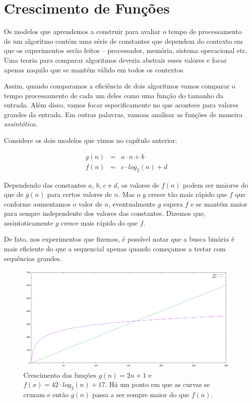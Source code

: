 \chapter{Crescimento de Funções}

Os modelos que aprendemos a construir para avaliar o tempo de processamento de um algoritmo contém uma série de constantes que dependem do contexto em que os experimentos serão feitos -- processador, memória, sistema operacional etc.
Uma teoria para comparar algoritmos deveria abstrair esses valores e focar apenas naquilo que se mantém válido em todos os contextos.

Assim, quando comparamos a eficiência de dois algoritmos vamos comparar o tempo processamento de cada um deles como uma função do tamanho da entrada.
Além disso, vamos focar especificamente no que acontece para valores grandes da entrada.
Em outras palavras, vamoas analisar as funções de maneira {\em assintótica}.

Considere os dois modelos que vimos no capítulo anterior:

\begin{eqnarray*}
  g(n) & = & a \cdot n + b\\
  f(n) & = & c \cdot log_2(n) + d
\end{eqnarray*}

Dependendo das constantes $a$, $b$, $c$ e $d$, os valores de $f(n)$ podem ser maiores do que de $g(n)$ para certos valores de $n$.
Mas o $g$ cresce tão mais rápido que $f$ que conforme aumentamos o valor de $n$, eventualmente $g$ supera $f$ e se mantém maior para sempre independente dos valores das constantes.
Dizemos que, assintoticamente $g$ cresce mais rápido do que $f$.

De fato, nos experimentos que fizemos, é possível notar que a busca binária é mais eficiente do que a sequencial apenas quando começamos a testar com sequências grandes.

\begin{figure}
\includegraphics[width=\textwidth]{imagens/grafico7.png}
\caption{Crescimento das funções $g(n) = 2n+1$ e $f(x) = 42 \cdot log_2(n) + 17$. Há um ponto em que as curvas se cruzam e então $g(n)$ passa a ser sempre maior do que $f(n)$.}
\end{figure}


